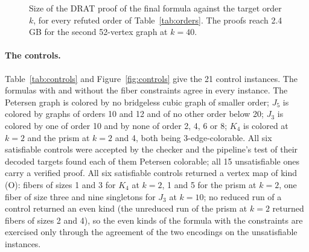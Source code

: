 \documentclass[11pt]{article}
\theoremstyle{definition}
\theoremstyle{remark}
\newcommand{\Ga}{G_{52}}
\newcommand{\Gb}{G'_{52}}
\newcommand{\Gsix}{G_{68}}
\begin{document}
\begin{figure}[tbp]\centering
{}
\caption{Size of the DRAT proof of the final formula against the target order $k$, for every refuted order of Table~\ref{tab:orders}. The proofs reach 2.4 GB for the second 52-vertex graph at $k=40$.}\label{fig:proof}
\end{figure}


\paragraph{The controls.} Table~\ref{tab:controls} and Figure~\ref{fig:controls} give the 21 control instances. The formulas with and without the fiber constraints agree in every instance. The Petersen graph is colored by no bridgeless cubic graph of smaller order; $J_5$ is colored by graphs of orders 10 and 12 and of no other order
below 20; $J_3$ is colored by one of order 10 and by none of order 2, 4, 6 or 8; $K_4$ is colored at $k = 2$ and the prism at $k = 2$ and 4, both being 3-edge-colorable. All six satisfiable controls were accepted by the checker and the pipeline's test of their decoded targets found each of them Petersen colorable; all 15 unsatisfiable ones carry a verified proof. All six satisfiable controls returned a vertex map of kind (O): fibers of sizes 1 and 3 for $K_4$ at $k = 2$, 1 and 5 for the prism at $k = 2$,
one fiber of size three and nine singletons for $J_3$ at $k = 10$; no reduced run of a control returned an even kind (the unreduced run of the prism at $k = 2$ returned fibers of sizes 2 and 4), so the even kinds of the formula with the constraints are exercised only through the agreement of the two encodings on the unsatisfiable instances.
\end{document}
